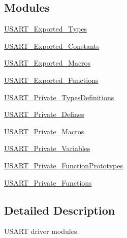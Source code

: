 \subsection*{Modules}
\begin{DoxyCompactItemize}
\item 
\hyperlink{group___u_s_a_r_t___exported___types}{U\+S\+A\+R\+T\+\_\+\+Exported\+\_\+\+Types}
\item 
\hyperlink{group___u_s_a_r_t___exported___constants}{U\+S\+A\+R\+T\+\_\+\+Exported\+\_\+\+Constants}
\item 
\hyperlink{group___u_s_a_r_t___exported___macros}{U\+S\+A\+R\+T\+\_\+\+Exported\+\_\+\+Macros}
\item 
\hyperlink{group___u_s_a_r_t___exported___functions}{U\+S\+A\+R\+T\+\_\+\+Exported\+\_\+\+Functions}
\item 
\hyperlink{group___u_s_a_r_t___private___types_definitions}{U\+S\+A\+R\+T\+\_\+\+Private\+\_\+\+Types\+Definitions}
\item 
\hyperlink{group___u_s_a_r_t___private___defines}{U\+S\+A\+R\+T\+\_\+\+Private\+\_\+\+Defines}
\item 
\hyperlink{group___u_s_a_r_t___private___macros}{U\+S\+A\+R\+T\+\_\+\+Private\+\_\+\+Macros}
\item 
\hyperlink{group___u_s_a_r_t___private___variables}{U\+S\+A\+R\+T\+\_\+\+Private\+\_\+\+Variables}
\item 
\hyperlink{group___u_s_a_r_t___private___function_prototypes}{U\+S\+A\+R\+T\+\_\+\+Private\+\_\+\+Function\+Prototypes}
\item 
\hyperlink{group___u_s_a_r_t___private___functions}{U\+S\+A\+R\+T\+\_\+\+Private\+\_\+\+Functions}
\end{DoxyCompactItemize}


\subsection{Detailed Description}
U\+S\+A\+RT driver modules. 

